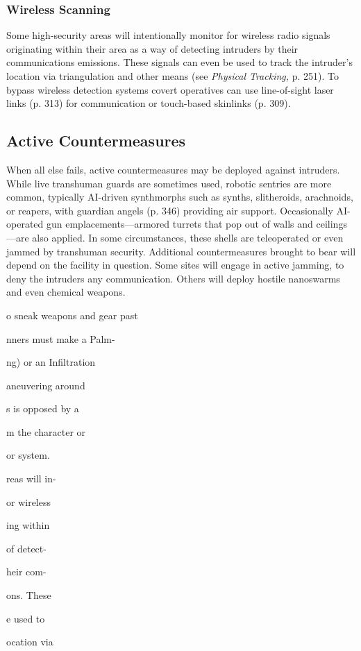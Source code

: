 \subsubsection{Wireless Scanning}

Some high-security areas will intentionally
monitor for wireless
radio signals originating within 
their area as a way of detecting
intruders by their communications
emissions. These
signals can even be used to 
track the intruder's location via 
triangulation and other means 
(see  \textit{Physical Tracking,} p. 251). 
To bypass wireless detection systems
covert operatives can use
line-of-sight laser links (p. 313) 
for communication or touch-based 
skinlinks (p. 309).

\subsection{Active Countermeasures}

When all else fails, active countermeasures
may be deployed against
intruders. While live transhuman
guards are sometimes
used, robotic sentries are more 
common, typically AI-driven 
synthmorphs such as synths, 
slitheroids, arachnoids, or 
reapers, with guardian angels 
(p. 346) providing air support. 
Occasionally AI-operated gun 
emplacements—armored turrets
that pop out of walls and
ceilings—are also applied. In 
some circumstances, these shells 
are teleoperated or even jammed 
by transhuman security.
Additional countermeasures 
brought to bear will depend on the facility
in question. Some sites will engage in
active jamming, to deny the intruders any 
communication. Others will deploy hostile 
nanoswarms and even chemical weapons.

o sneak weapons and gear past

nners must make a Palm-

ng) or an Infiltration

aneuvering around 

s is opposed  by  a 

m  the character or 

or system.

reas will in-

or wireless

ing within

of detect-

heir com-

ons. These

e used to

ocation via 

